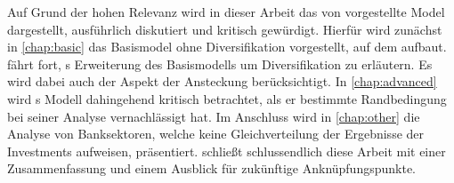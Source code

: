 Auf Grund der hohen Relevanz wird in dieser Arbeit das von \citeauthor{Wagner-2010} vorgestellte Model dargestellt, ausführlich diskutiert und kritisch gewürdigt. Hierfür wird zunächst in \cref{chap:basic} das Basismodel ohne Diversifikation vorgestellt, auf dem \citeauthor{Wagner-2010} aufbaut.  fährt fort, \citeauthor{Wagner-2010}s Erweiterung des Basismodells um Diversifikation zu erläutern. Es wird dabei auch der Aspekt der Ansteckung berücksichtigt. In \cref{chap:advanced} wird \citeauthor{Wagner-2010}s Modell dahingehend kritisch betrachtet, als er bestimmte Randbedingung bei seiner Analyse vernachlässigt hat. Im Anschluss wird in \cref{chap:other} die Analyse von Banksektoren, welche keine Gleichverteilung der Ergebnisse der Investments aufweisen, präsentiert.  schließt schlussendlich diese Arbeit mit einer Zusammenfassung und einem Ausblick für zukünftige Anknüpfungspunkte.
